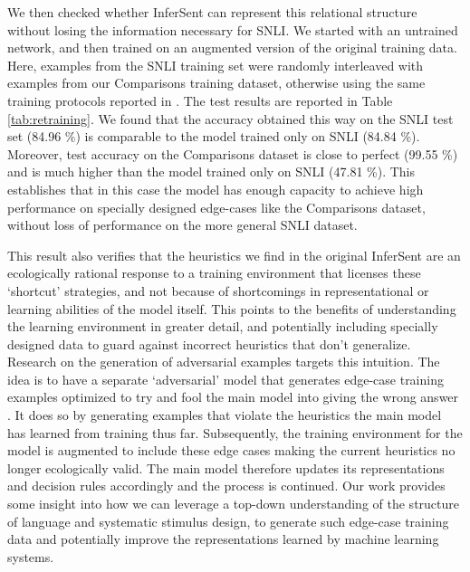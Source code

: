 We then checked whether InferSent can represent this relational structure without losing the information necessary for SNLI. We started with an untrained network, and then trained on an augmented version of the original training data. Here, examples from the SNLI training set were randomly interleaved with examples from our Comparisons training dataset, otherwise using the same training protocols reported in \citep{Conneau:2017uf}. The test results are reported in Table \ref{tab:retraining}. We found that the accuracy obtained this way on the SNLI test set (84.96 \%) is comparable to the model trained only on SNLI (84.84 \%). Moreover, test accuracy on the Comparisons dataset is close to perfect (99.55 \%) and is much higher than the model trained only on SNLI (47.81 \%). This establishes that in this case the model has enough capacity to achieve high performance on specially designed edge-cases like the Comparisons dataset, without loss of performance on the more general SNLI dataset.

This result also verifies that the heuristics we find in the original InferSent are an ecologically rational response to a training environment that licenses these `shortcut' strategies, and not because of shortcomings in representational or learning abilities of the model itself. This points to the benefits of understanding the learning environment in greater detail, and potentially including specially designed data to guard against incorrect heuristics that don't generalize. Research on the generation of adversarial examples targets this intuition. The idea is to have a separate `adversarial' model that generates edge-case training examples optimized to try and fool the main model into giving the wrong answer \citep{goodfellow2014explaining, zhao2017generating}. It does so by generating examples that violate the heuristics the main model has learned from training thus far. Subsequently, the training environment for the model is augmented to include these edge cases making the current heuristics no longer ecologically valid. The main model therefore updates its representations and decision rules accordingly and the process is continued. Our work provides some insight into how we can leverage a top-down understanding of the structure of language and systematic stimulus design, to generate such edge-case training data and potentially improve the representations learned by machine learning systems. 

